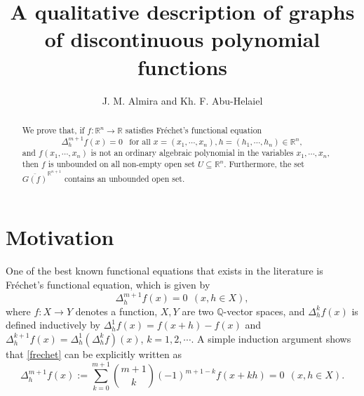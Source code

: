 \documentclass[10pt,a4paper]{amsart}
\author{J. M. Almira and  Kh. F. Abu-Helaiel}
\title{ A qualitative description of graphs of discontinuous polynomial functions}
\theoremstyle{definition}
\begin{document}


\begin{abstract} We prove that, if  $f:\mathbb{R}^n\to\mathbb{R}$ satisfies  Fr\'{e}chet's functional equation
\[
\Delta_h^{m+1}f(x)=0 \ \ \text{ for all  }x=(x_1,\cdots,x_n),h=(h_1,\cdots,h_n) \in\mathbb{R}^n,
\]
and $f(x_1,\cdots,x_n)$ is not an ordinary algebraic polynomial in the variables $x_1,\cdots,x_n$, then   $f$ is unbounded on all non-empty open set $U\subseteq \mathbb{R}^n$. Furthermore,  the set $\overline{G(f)}^{\mathbb{R}^{n+1}}$ contains an unbounded open set.  
\end{abstract}

\maketitle

\section{Motivation}

One of the best known functional equations that exists in the literature is Fr\'{e}chet's functional equation, which is given by 
\begin{equation}\label{frechet}
\Delta^{m+1}_hf(x)=0 \ \ (x,h\in X),                                                                                      
\end{equation}
where $f:X\to Y$ denotes a function, $X,Y$ are two $\mathbb{Q}$-vector spaces, and $\Delta^{k}_hf(x)$ is defined inductively by $\Delta_h^1f(x)=f(x+h)-f(x)$ and $\Delta_{h}^{k+1}f(x)=\Delta_{h}^1\left(\Delta_{h}^kf\right)(x)$, $k=1,2,\cdots$. A simple induction argument shows that \eqref{frechet} can be explicitly written as
\begin{equation}\label{frepasofijo}
\Delta_{h}^{m+1}f(x):=\sum_{k=0}^{m+1}\binom{m+1}{k}(-1)^{m+1-k}f(x+kh)=0 \ \ (x,h\in X).
\end{equation}
\end{document}
